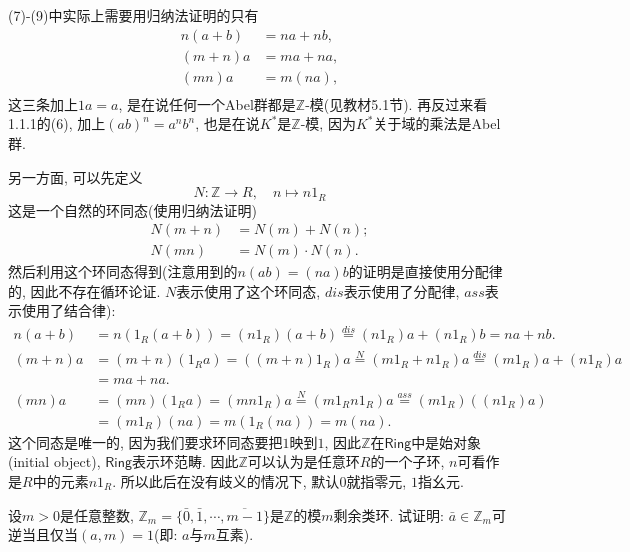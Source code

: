 \documentclass{../solutions-cn}
\begin{document}
\begin{remark}
    (7)-(9)中实际上需要用归纳法证明的只有
    \[
    \begin{aligned}
        n(a + b) &= na + nb,\\
        (m + n)a &= ma + na,\\
        (mn)a &= m(na),\\
    \end{aligned}
    \]
    这三条加上$1a = a$, 是在说任何一个Abel群都是$\mathbb{Z}$-模(见教材5.1节). 再反过来看1.1.1的(6), 加上$(ab)^n = a^nb^n$, 也是在说$K^*$是$\mathbb{Z}$-模, 因为$K^*$关于域的乘法是Abel群.
    
    另一方面, 可以先定义
    \[
        N: \mathbb{Z} \to R,\quad n \mapsto n1_R
    \]
    这是一个自然的环同态(使用归纳法证明)
    \[
    \begin{aligned}
        N(m + n) &= N(m) + N(n);\\
        N(mn) &= N(m) \cdot N(n).
    \end{aligned}
    \]
    然后利用这个环同态得到(注意用到的$n(ab) = (na)b$的证明是直接使用分配律的, 因此不存在循环论证. $N$表示使用了这个环同态, $dis$表示使用了分配律, $ass$表示使用了结合律):
    \[
    \begin{aligned}
        n(a + b) &= n(1_R(a + b)) = (n1_R)(a + b) \overset{dis}= (n1_R)a + (n1_R)b = na + nb.\\
        (m + n)a &= (m + n)(1_Ra) = ((m + n)1_R)a \overset{N}= (m1_R + n1_R)a \overset{dis}= (m1_R)a + (n1_R)a\\
        &= ma + na.\\
        (mn)a &= (mn)(1_Ra) = (mn1_R)a \overset{N}= (m1_Rn1_R)a \overset{ass}= (m1_R)((n1_R)a)\\
        &= (m1_R)(na) = m(1_R(na)) = m(na).
    \end{aligned}
    \]
    这个同态是唯一的, 因为我们要求环同态要把$1$映到$1$, 因此$\mathbb{Z}$在$\mathsf{Ring}$中是始对象(initial object), $\mathsf{Ring}$表示环范畴. 因此$\mathbb{Z}$可以认为是任意环$R$的一个子环, $n$可看作是$R$中的元素$n1_R$. 所以此后在没有歧义的情况下, 默认$0$就指零元, $1$指幺元.
\end{remark}

\begin{exercise}[习题1.2.9]
    设$m > 0$是任意整数, $\mathbb{Z}_m = \{\bar{0}, \bar{1}, \cdots, \overline{m-1}\}$是$\mathbb{Z}$的模$m$剩余类环. 试证明: $\bar{a} \in \mathbb{Z}_m$可逆当且仅当$(a, m) = 1$(即: $a$与$m$互素).
\end{exercise}
\end{document}
